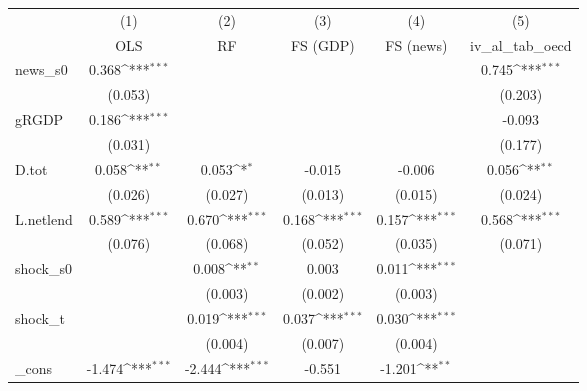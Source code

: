 {
\def\sym#1{\ifmmode^{#1}\else\(^{#1}\)\fi}
\begin{tabular}{l*{5}{c}}
\toprule
            &\multicolumn{1}{c}{(1)}&\multicolumn{1}{c}{(2)}&\multicolumn{1}{c}{(3)}&\multicolumn{1}{c}{(4)}&\multicolumn{1}{c}{(5)}\\
            &\multicolumn{1}{c}{OLS}&\multicolumn{1}{c}{RF}&\multicolumn{1}{c}{FS (GDP)}&\multicolumn{1}{c}{FS (news)}&\multicolumn{1}{c}{iv\_al\_tab\_oecd}\\
\midrule
news\_s0     &       0.368\sym{***}&                     &                     &                     &       0.745\sym{***}\\
            &     (0.053)         &                     &                     &                     &     (0.203)         \\
\addlinespace
gRGDP       &       0.186\sym{***}&                     &                     &                     &      -0.093         \\
            &     (0.031)         &                     &                     &                     &     (0.177)         \\
\addlinespace
D.tot       &       0.058\sym{**} &       0.053\sym{*}  &      -0.015         &      -0.006         &       0.056\sym{**} \\
            &     (0.026)         &     (0.027)         &     (0.013)         &     (0.015)         &     (0.024)         \\
\addlinespace
L.netlend   &       0.589\sym{***}&       0.670\sym{***}&       0.168\sym{***}&       0.157\sym{***}&       0.568\sym{***}\\
            &     (0.076)         &     (0.068)         &     (0.052)         &     (0.035)         &     (0.071)         \\
\addlinespace
shock\_s0    &                     &       0.008\sym{**} &       0.003         &       0.011\sym{***}&                     \\
            &                     &     (0.003)         &     (0.002)         &     (0.003)         &                     \\
\addlinespace
shock\_t     &                     &       0.019\sym{***}&       0.037\sym{***}&       0.030\sym{***}&                     \\
            &                     &     (0.004)         &     (0.007)         &     (0.004)         &                     \\
\addlinespace
\_cons      &      -1.474\sym{***}&      -2.444\sym{***}&      -0.551         &      -1.201\sym{**} &                     \\

\end{tabular}}
